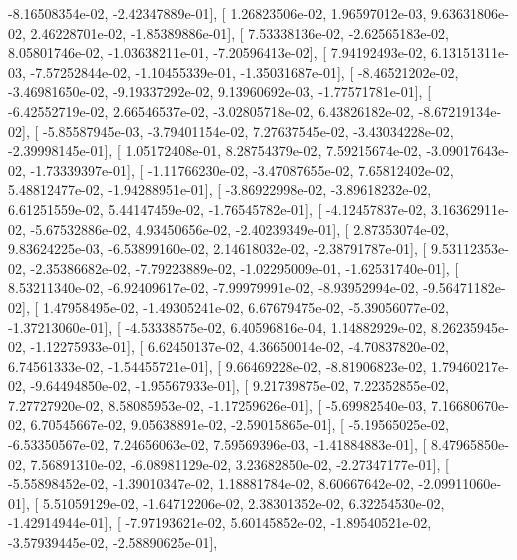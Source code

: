 \documentclass{article}
\begin{document}
         -8.16508354e-02,  -2.42347889e-01],
       [  1.26823506e-02,   1.96597012e-03,   9.63631806e-02,
          2.46228701e-02,  -1.85389886e-01],
       [  7.53338136e-02,  -2.62565183e-02,   8.05801746e-02,
         -1.03638211e-01,  -7.20596413e-02],
       [  7.94192493e-02,   6.13151311e-03,  -7.57252844e-02,
         -1.10455339e-01,  -1.35031687e-01],
       [ -8.46521202e-02,  -3.46981650e-02,  -9.19337292e-02,
          9.13960692e-03,  -1.77571781e-01],
       [ -6.42552719e-02,   2.66546537e-02,  -3.02805718e-02,
          6.43826182e-02,  -8.67219134e-02],
       [ -5.85587945e-03,  -3.79401154e-02,   7.27637545e-02,
         -3.43034228e-02,  -2.39998145e-01],
       [  1.05172408e-01,   8.28754379e-02,   7.59215674e-02,
         -3.09017643e-02,  -1.73339397e-01],
       [ -1.11766230e-02,  -3.47087655e-02,   7.65812402e-02,
          5.48812477e-02,  -1.94288951e-01],
       [ -3.86922998e-02,  -3.89618232e-02,   6.61251559e-02,
          5.44147459e-02,  -1.76545782e-01],
       [ -4.12457837e-02,   3.16362911e-02,  -5.67532886e-02,
          4.93450656e-02,  -2.40239349e-01],
       [  2.87353074e-02,   9.83624225e-03,  -6.53899160e-02,
          2.14618032e-02,  -2.38791787e-01],
       [  9.53112353e-02,  -2.35386682e-02,  -7.79223889e-02,
         -1.02295009e-01,  -1.62531740e-01],
       [  8.53211340e-02,  -6.92409617e-02,  -7.99979991e-02,
         -8.93952994e-02,  -9.56471182e-02],
       [  1.47958495e-02,  -1.49305241e-02,   6.67679475e-02,
         -5.39056077e-02,  -1.37213060e-01],
       [ -4.53338575e-02,   6.40596816e-04,   1.14882929e-02,
          8.26235945e-02,  -1.12275933e-01],
       [  6.62450137e-02,   4.36650014e-02,  -4.70837820e-02,
          6.74561333e-02,  -1.54455721e-01],
       [  9.66469228e-02,  -8.81906823e-02,   1.79460217e-02,
         -9.64494850e-02,  -1.95567933e-01],
       [  9.21739875e-02,   7.22352855e-02,   7.27727920e-02,
          8.58085953e-02,  -1.17259626e-01],
       [ -5.69982540e-03,   7.16680670e-02,   6.70545667e-02,
          9.05638891e-02,  -2.59015865e-01],
       [ -5.19565025e-02,  -6.53350567e-02,   7.24656063e-02,
          7.59569396e-03,  -1.41884883e-01],
       [  8.47965850e-02,   7.56891310e-02,  -6.08981129e-02,
          3.23682850e-02,  -2.27347177e-01],
       [ -5.55898452e-02,  -1.39010347e-02,   1.18881784e-02,
          8.60667642e-02,  -2.09911060e-01],
       [  5.51059129e-02,  -1.64712206e-02,   2.38301352e-02,
          6.32254530e-02,  -1.42914944e-01],
       [ -7.97193621e-02,   5.60145852e-02,  -1.89540521e-02,
         -3.57939445e-02,  -2.58890625e-01],
\end{document}
